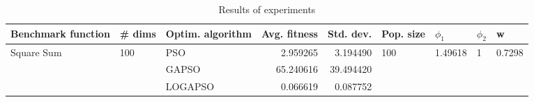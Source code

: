 \begin{table}
\centering
\caption{Results of experiments}
\begin{tabular}{lllrrllll}
\toprule
         Benchmark function &              \# dims & Optim. algorithm &  Avg. fitness &  Std. dev. &            Pop. size &               $\phi_{1}$ &         $\phi_{2}$ &                       w \\
\midrule
\multirow{3}{*}{Square Sum} & \multirow{3}{*}{100} &              PSO &      2.959265 &   3.194490 & \multirow{3}{*}{100} & \multirow{3}{*}{1.49618} & \multirow{3}{*}{1} & \multirow{3}{*}{0.7298} \\
                            &                      &            GAPSO &     65.240616 &  39.494420 &                      &                          &                    &                         \\
                            &                      &          LOGAPSO &      0.066619 &   0.087752 &                      &                          &                    &                         \\
\bottomrule
\end{tabular}
\end{table}
